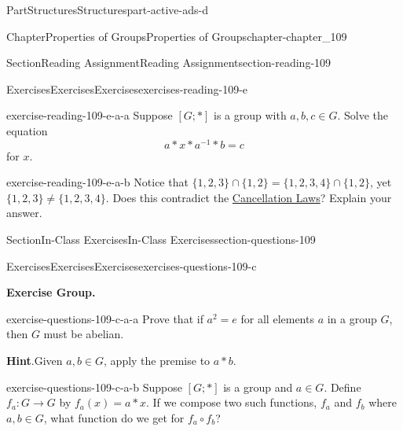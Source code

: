 \documentclass[oneside,10pt,]{book}
\newcommand{\blocktitlefont}{\relax}
\numberwithin{equation}{section}
\begin{document}
\begin{partptx}{Part}{Structures}{}{Structures}{}{}{part-active-ads-d}
\begin{chapterptx}{Chapter}{Properties of Groups}{}{Properties of Groups}{}{}{chapter-chapter_109}
\begin{sectionptx}{Section}{Reading Assignment}{}{Reading Assignment}{}{}{section-reading-109}
\begin{exercises-subsection-numberless}{Exercises}{Exercises}{}{Exercises}{}{}{exercises-reading-109-e}
\begin{exercisegroup}
\begin{divisionexerciseeg}{1}{}{}{exercise-reading-109-e-a-a}%
Suppose \([G;*]\) is a group with \(a,b,c \in G\).   Solve the equation%
\begin{equation*}
a*x*a^{-1}*b= c
\end{equation*}
for \(x\).%
\end{divisionexerciseeg}%
\begin{divisionexerciseeg}{2}{}{}{exercise-reading-109-e-a-b}%
Notice that \(\{1,2,3\} \cap \{1,2\} = \{1,2,3,4\} \cap \{1,2\}\), yet \(\{1,2,3\}  \neq \{1,2,3,4\} \). Does this contradict the \hyperref[theorem-theorem-11-3-cancellation]{Cancellation Laws}? Explain your answer.%
\end{divisionexerciseeg}%
\end{exercisegroup}
\par\medskip\noindent
\end{exercises-subsection-numberless}
\end{sectionptx}
%
%
\typeout{************************************************}
\typeout{************************************************}
%
\begin{sectionptx}{Section}{In-Class Exercises}{}{In-Class Exercises}{}{}{section-questions-109}
%
%
%
\typeout{************************************************}
\typeout{************************************************}
%
\begin{exercises-subsection-numberless}{Exercises}{Exercises}{}{Exercises}{}{}{exercises-questions-109-c}
\par\medskip\noindent%
\textbf{Exercise Group.}\space\space%
\begin{exercisegroup}
\begin{divisionexerciseeg}{1}{}{}{exercise-questions-109-c-a-a}%
Prove that if \(a^2 = e\) for all elements \(a\) in a group \(G\), then \(G\) must be abelian.%
\par\smallskip%
\noindent\textbf{\blocktitlefont Hint}.\hypertarget{hint-questions-109-c-a-a-b}{}\quad{}Given \(a, b \in G\), apply the premise to \(a*b\).%
\end{divisionexerciseeg}%
\begin{divisionexerciseeg}{2}{}{}{exercise-questions-109-c-a-b}%
Suppose \([G;*]\) is a group and \(a \in G\).  Define \(f_a:G \to  G\) by \(f_a(x) = a * x\).  If we compose two such functions, \(f_a\) and \(f_b\) where \(a, b \in G\), what function do we get for \(f_a \circ f_b\)?%

\end{divisionexerciseeg}
\end{exercisegroup}
\end{exercises-subsection-numberless}
\end{sectionptx}
\end{chapterptx}
\end{partptx}
\end{document}
